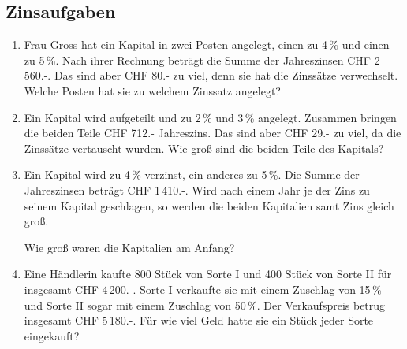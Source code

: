 \subsection{Zinsaufgaben}
\begin{enumerate}[label=\alph*)]
\item
Frau Gross hat ein Kapital in zwei Posten angelegt, einen zu 4\,\% und
einen zu 5\,\%. Nach ihrer Rechnung beträgt die Summe der Jahreszinsen
CHF 2\,560.-. Das sind aber CHF 80.- zu viel, denn sie hat die
Zinssätze verwechselt. Welche Posten hat sie zu welchem Zinssatz
angelegt?

\item

Ein Kapital wird aufgeteilt und zu 2\,\% und 3\,\% angelegt. Zusammen
bringen die beiden Teile CHF 712.- Jahreszins. Das sind aber CHF 29.-
zu viel, da die Zinssätze vertauscht wurden. Wie groß sind die beiden
Teile des Kapitals?

\item
Ein Kapital wird zu 4\,\% verzinst, ein anderes zu 5\,\%. Die Summe der
Jahreszinsen beträgt CHF 1\,410.-. Wird nach einem Jahr je der Zins zu
seinem Kapital geschlagen, so werden die beiden Kapitalien samt Zins
gleich groß.

Wie groß waren die Kapitalien am Anfang?

\item
Eine Händlerin kaufte 800 Stück von Sorte I und 400 Stück von Sorte II
für insgesamt CHF 4\,200.-. Sorte I verkaufte sie mit einem Zuschlag
von 15\,\% und Sorte II sogar mit einem Zuschlag von 50\,\%. Der
Verkaufspreis betrug insgesamt CHF 5\,180.-. Für wie viel Geld hatte
sie ein Stück jeder Sorte eingekauft?


\end{enumerate}
\newpage

